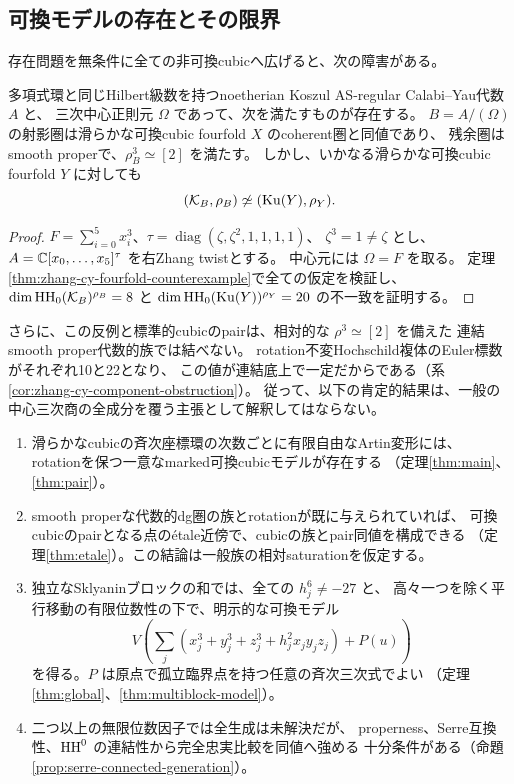 \subsection{可換モデルの存在とその限界}

存在問題を無条件に全ての非可換cubicへ広げると、次の障害がある。

\begin{theorem}[一般的なrotation付き可換復元の反例]\label{thm:overview-negative}
 多項式環と同じHilbert級数を持つnoetherian Koszul AS-regular Calabi--Yau代数 \(A\) と、
 三次中心正則元 \(\Omega\) であって、次を満たすものが存在する。
 \(B=A/(\Omega)\) の射影圏は滑らかな可換cubic fourfold \(X\) のcoherent圏と同値であり、
 残余圏はsmooth properで、\(\rho_B^3\simeq[2]\) を満たす。
 しかし、いかなる滑らかな可換cubic fourfold \(Y\) に対しても
 \[
 (\mathcal K_B,\rho_B)\not\simeq(\operatorname{Ku}(Y),\rho_Y).
 \]
\end{theorem}
\begin{proof}
 \(F=\sum_{i=0}^5x_i^3\)、\(\tau=\operatorname{diag}(\zeta,\zeta^2,1,1,1,1)\)、
 \(\zeta^3=1\ne\zeta\) とし、\(A=\mathbb C[x_0,\ldots,x_5]^\tau\) を右Zhang twistとする。
 中心元には \(\Omega=F\) を取る。
 定理\ref{thm:zhang-cy-fourfold-counterexample}で全ての仮定を検証し、
 \(\dim\operatorname{HH}_0(\mathcal K_B)^{\rho_B}=8\) と
 \(\dim\operatorname{HH}_0(\operatorname{Ku}(Y))^{\rho_Y}=20\) の不一致を証明する。
\end{proof}

さらに、この反例と標準的cubicのpairは、相対的な \(\rho^3\simeq[2]\) を備えた
連結smooth proper代数的族では結べない。
rotation不変Hochschild複体のEuler標数がそれぞれ10と22となり、
この値が連結底上で一定だからである（系\ref{cor:zhang-cy-component-obstruction}）。
従って、以下の肯定的結果は、一般の中心三次商の全成分を覆う主張として解釈してはならない。

\begin{enumerate}
 \item 滑らかなcubicの斉次座標環の次数ごとに有限自由なArtin変形には、
 rotationを保つ一意なmarked可換cubicモデルが存在する
 （定理\ref{thm:main}、\ref{thm:pair}）。
 \item smooth properな代数的dg圏の族とrotationが既に与えられていれば、
 可換cubicのpairとなる点のétale近傍で、cubicの族とpair同値を構成できる
 （定理\ref{thm:etale}）。この結論は一般族の相対saturationを仮定する。
 \item 独立なSklyaninブロックの和では、全ての \(h_j^6\ne-27\) と、
 高々一つを除く平行移動の有限位数性の下で、明示的な可換モデル
 \[
 V\!\left(\sum_j(x_j^3+y_j^3+z_j^3+h_j^2x_jy_jz_j)+P(u)\right)
 \]
 を得る。\(P\) は原点で孤立臨界点を持つ任意の斉次三次式でよい
 （定理\ref{thm:global}、\ref{thm:multiblock-model}）。
 \item 二つ以上の無限位数因子では全生成は未解決だが、
 properness、Serre互換性、\(\operatorname{HH}^0\) の連結性から完全忠実比較を同値へ強める
 十分条件がある（命題\ref{prop:serre-connected-generation}）。
\end{enumerate}

